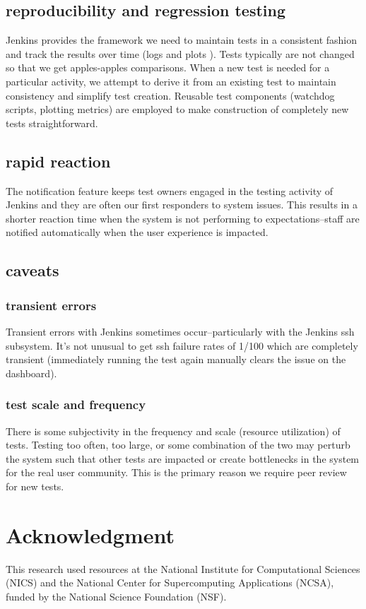 \documentclass[10pt, conference, compsocconf]{IEEEtran}
\begin{document}
{\subsection{reproducibility and regression testing}
Jenkins provides the framework we need to maintain tests in a consistent fashion and track the results over time (logs and plots ).  Tests typically are not changed so that we get apples-apples comparisons.  When a new test is needed for a particular activity, we attempt to derive it from an existing test to maintain consistency and simplify test creation.  Reusable test components (watchdog scripts, plotting metrics) are employed to make construction of completely new tests straightforward.
\subsection{rapid reaction}
The notification feature keeps test owners engaged in the testing activity of Jenkins and they are often our first responders to system issues.  This results in a shorter reaction time when the system is not performing to expectations--staff are notified automatically when the user experience is impacted.
\subsection{caveats}
\subsubsection{transient errors}
Transient errors with Jenkins sometimes occur--particularly with the Jenkins ssh subsystem.  It's not unusual to get ssh failure rates of 1/100 which are completely transient (immediately running the test again manually clears the issue on the dashboard).
\subsubsection{test scale and frequency}
There is some subjectivity in the frequency and scale (resource utilization) of tests.  Testing too often, too large, or some combination of the two may perturb the system such that other tests are impacted or create bottlenecks in the system for the real user community.  This is the primary reason we require peer review for new tests.


\section*{Acknowledgment}
This research used resources at the National Institute for Computational Sciences (NICS) and the National Center for Supercomputing Applications (NCSA), funded by the National Science Foundation (NSF).

}
\end{document}
